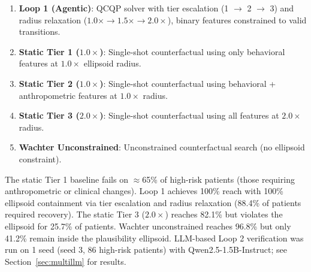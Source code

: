 \documentclass[11pt,a4paper]{article}
\theoremstyle{plain}
\begin{document}
\begin{enumerate}
    \item \textbf{Loop 1 (Agentic)}: QCQP solver with tier escalation (1 $\to$ 2 $\to$ 3) and radius relaxation ($1.0\times \to 1.5\times \to 2.0\times$), binary features constrained to valid transitions.
    \item \textbf{Static Tier 1 ($1.0\times$)}: Single-shot counterfactual using only behavioral features at $1.0\times$ ellipsoid radius.
    \item \textbf{Static Tier 2 ($1.0\times$)}: Single-shot counterfactual using behavioral + anthropometric features at $1.0\times$ radius.
    \item \textbf{Static Tier 3 ($2.0\times$)}: Single-shot counterfactual using all features at $2.0\times$ radius.
    \item \textbf{Wachter Unconstrained}: Unconstrained counterfactual search (no ellipsoid constraint).
\end{enumerate}

\begin{table}[htbp]
\centering
\caption{Counterfactual recovery comparison on high-risk patients (mean across 20 seeds, $n \approx 55$ per seed). Reach = fraction reaching $p \le 0.5$. Containment = fraction inside 90th-percentile ellipsoid.}
\label{tab:counterfactual_baselines}
\end{table}

The static Tier 1 baseline fails on $\approx$65\% of high-risk patients (those requiring anthropometric or clinical changes). Loop 1 achieves 100\% reach with 100\% ellipsoid containment via tier escalation and radius relaxation (88.4\% of patients required recovery). The static Tier 3 ($2.0\times$) reaches 82.1\% but violates the ellipsoid for 25.7\% of patients. Wachter unconstrained reaches 96.8\% but only 41.2\% remain inside the plausibility ellipsoid. LLM-based Loop 2 verification was run on 1 seed (seed 3, 86 high-risk patients) with Qwen2.5-1.5B-Instruct; see Section~\ref{sec:multillm} for results.
\end{document}
